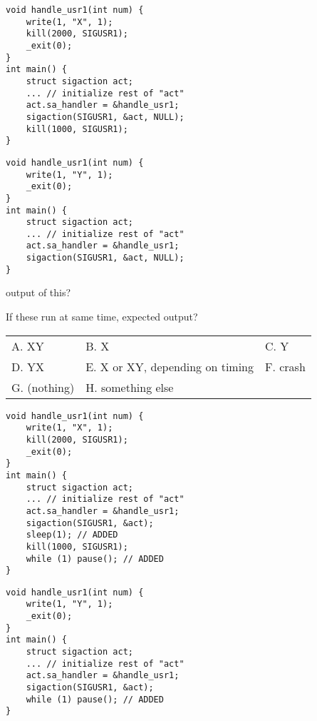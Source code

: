 
\ifdefined\codeBoxA\else\newsavebox\codeBoxA\fi
\begin{lrbox}{\codeBoxA}
\lstset{language=C,style=script}
\begin{lstlisting}
void handle_usr1(int num) {
    write(1, "X", 1);
    kill(2000, SIGUSR1);
    _exit(0);
}
int main() {
    struct sigaction act; 
    ... // initialize rest of "act"
    act.sa_handler = &handle_usr1;
    sigaction(SIGUSR1, &act, NULL);
    kill(1000, SIGUSR1);
}
\end{lstlisting}
\end{lrbox}
\ifdefined\codeBoxB\else\newsavebox\codeBoxB\fi
\begin{lrbox}{\codeBoxA}
\lstset{language=C,style=script}
\begin{lstlisting}
void handle_usr1(int num) {
    write(1, "Y", 1);
    _exit(0);
}
int main() {
    struct sigaction act;
    ... // initialize rest of "act"
    act.sa_handler = &handle_usr1;
    sigaction(SIGUSR1, &act, NULL);
}
\end{lstlisting}
\end{lrbox}

\begin{frame}[fragile,label=signalEx]{output of this?}

If these run at same time, expected output?
\begin{tabular}{lll}
A. XY & B. X & C. Y \\
D. YX & E. X or XY, depending on timing & F. crash \\
G. (nothing) & H. something else \\
\end{tabular}
\end{frame}

\ifdefined\codeBoxA\else\newsavebox\codeBoxA\fi
\begin{lrbox}{\codeBoxA}
\lstset{language=C,style=script}
\begin{lstlisting}
void handle_usr1(int num) {
    write(1, "X", 1);
    kill(2000, SIGUSR1);
    _exit(0);
}
int main() {
    struct sigaction act;
    ... // initialize rest of "act"
    act.sa_handler = &handle_usr1;
    sigaction(SIGUSR1, &act);
    sleep(1); // ADDED
    kill(1000, SIGUSR1);
    while (1) pause(); // ADDED
}
\end{lstlisting}
\end{lrbox}
\ifdefined\codeBoxB\else\newsavebox\codeBoxB\fi
\begin{lrbox}{\codeBoxA}
\lstset{language=C,style=script}
\begin{lstlisting}
void handle_usr1(int num) {
    write(1, "Y", 1);
    _exit(0);
}
int main() {
    struct sigaction act;
    ... // initialize rest of "act"
    act.sa_handler = &handle_usr1;
    sigaction(SIGUSR1, &act);
    while (1) pause(); // ADDED
}
\end{lstlisting}
\end{lrbox}

